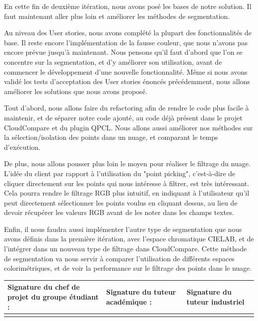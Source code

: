 \documentclass[12pt,titlepage,french]{article}
\begin{document}
En cette fin de deuxième itération, nous avons posé les bases de notre solution. Il faut maintenant aller plus loin et améliorer les méthodes de segmentation.

Au niveau des User stories, nous avons complété la plupart des fonctionnalités de base. Il reste encore l'implémentation de la fausse couleur, que nous n'avons pas encore prévue jusqu'à maintenant. Nous pensons qu'il faut d'abord que l'on se concentre sur la segmentation, et d'y améliorer son utilisation, avant de commencer le développement d'une nouvelle fonctionnalité. Même si nous avons validé les tests d'acceptation des User stories énoncés précédemment, nous allons améliorer les solutions que nous avons proposé.

Tout d'abord, nous allons faire du refactoring afin de rendre le code plus facile à maintenir, et de séparer notre code ajouté, au code déjà présent dans le projet CloudCompare et du plugin QPCL. Nous allons aussi améliorer nos méthodes sur la sélection/isolation des points dans un nuage, et comparant le temps d'exécution.

De plus, nous allons pousser plus loin le moyen pour réaliser le filtrage du nuage. L'idée du client par rapport à l'utilisation du "point picking", c'est-à-dire de cliquer directement sur les points qui nous intéresse à filtrer, est très intéressant. Cela pourra rendre le filtrage RGB plus intuitif, en indiquant à l'utilisateur qu'il peut directement sélectionner les points voulus en cliquant dessus, au lieu de devoir récupérer les valeurs RGB avant de les noter dans les champs textes.

Enfin, il nous faudra aussi implémenter l'autre type de segmentation que nous avons définis dans la première itération, avec l'espace chromatique CIELAB, et de l'intégrer dans un nouveau type de filtrage dans CloudCompare. Cette méthode de segmentation va nous servir à comparer l'utilisation de différents espaces colorimétriques, et de voir la performance sur le filtrage des points dans le nuage.\\


\noindent\begin{tabularx}{\textwidth}{|X|X|X|}
    \hline
    \textbf{Signature du chef de projet du groupe étudiant :} & \textbf{Signature du tuteur académique :} & \textbf{Signature du tuteur industriel}\\
    \hline
   \rule{0pt}{3cm} &
    &\\
    \hline
\end{tabularx}
\end{document}
